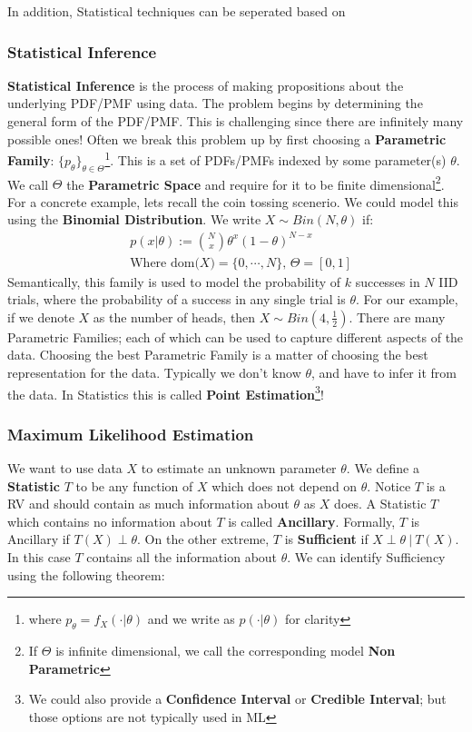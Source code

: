 \documentclass[]{article}
\theoremstyle{mattstyle}
\theoremstyle{definition}
\begin{document}
In addition, Statistical techniques can be seperated based on 

\subsubsection{Statistical Inference}

\textbf{Statistical Inference}  is the process of making propositions about the underlying PDF/PMF using data. The problem begins by determining the general form of the PDF/PMF. This is challenging since there are infinitely many possible ones! 
Often we break this problem up by first choosing a \textbf{Parametric Family}: $\{p_{\theta}\}_{\theta\in\Theta}$\footnote{where $p_{\theta} = f_X(\cdot|\theta)$ and we write as $p(\cdot|\theta)$ for clarity}. This is a set of PDFs/PMFs indexed by some parameter(s) $\theta$. We call $\Theta$ the \textbf{Parametric Space} and require for it to be finite dimensional\footnote{If $\Theta$ is infinite dimensional, we call the corresponding model \textbf{Non Parametric}}. For a concrete example, lets recall the coin tossing scenerio. We could model this using the \textbf{Binomial Distribution}. We write $X\sim Bin(N, \theta)$ if:
\begin{align*}
&p(x|\theta) := {N \choose x}\theta^x(1-\theta)^{N-x}\\
&\text{Where dom($X$)$=\{0, \cdots, N\}$, $\Theta=[0,1]$}
\end{align*}
Semantically, this family is used to model the probability of $k$ successes in $N$ IID trials, where the probability of a success in any single trial is $\theta$. For our example, if we denote $X$ as the number of heads, then $X \sim Bin(4, \frac{1}{2})$. There are many Parametric Families; each of which can be used to capture different aspects of the data. Choosing the best Parametric Family is a matter of choosing the best representation for the data. Typically we don't know $\theta$, and have to infer it from the data. In Statistics this is called \textbf{Point Estimation}\footnote{We could also provide a \textbf{Confidence Interval} or \textbf{Credible Interval}; but those options are not typically used in ML}!

\newpage

\subsubsection{Maximum Likelihood Estimation}\label{sec:parest}

We want to use data $X$ to estimate an unknown parameter $\theta$. We define a \textbf{Statistic} $T$ to be any function of $X$ which does not depend on $\theta$. Notice $T$ is a RV and should contain as much information about $\theta$ as $X$ does. A Statistic $T$ which contains no information about $T$ is called \textbf{Ancillary}. Formally, $T$ is Ancillary if $T(X) \perp \theta$. On the other extreme, $T$ is \textbf{Sufficient} if $X \perp \theta \ | \ T(X)$. In this case $T$ contains all the information about $\theta$. We can identify Sufficiency using the following theorem:
\end{document}
